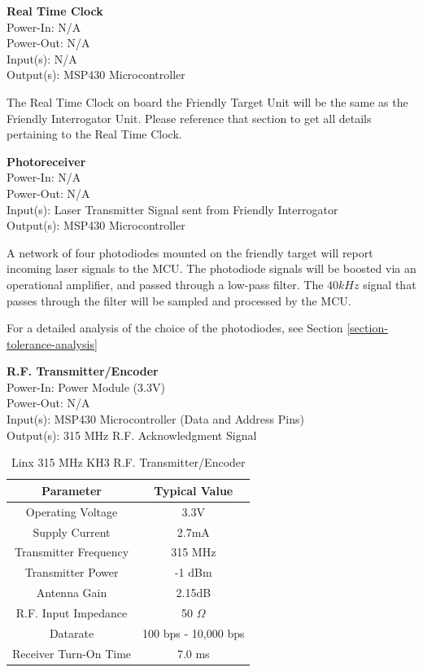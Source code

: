 \documentclass[letterpaper,10pt]{article}
\begin{document}
\begin{spacing}{1.15}
\normalsize\textbf{Real Time Clock} \\
Power-In: N/A\\
Power-Out: N/A\\
Input(s): N/A\\
Output(s): MSP430 Microcontroller

The Real Time Clock on board the Friendly Target Unit will be the same as the Friendly Interrogator Unit. Please reference that section to get all details pertaining to the Real Time Clock.

\normalsize\textbf{Photoreceiver}\\
Power-In: N/A \\
Power-Out: N/A \\
Input(s): Laser Transmitter Signal sent from Friendly Interrogator\\
Output(s): MSP430 Microcontroller

A network of four photodiodes mounted on the friendly target will report incoming laser signals to the MCU. The photodiode signals will be boosted via an operational amplifier, and passed through a low-pass filter. The $40kHz$ signal that passes through the filter will be sampled and processed by the MCU. 

For a detailed analysis of the choice of the photodiodes, see Section \ref{section-tolerance-analysis}

\normalsize\textbf{R.F. Transmitter/Encoder}\\
Power-In: Power Module (3.3V)\\
Power-Out: N/A\\ 
Input(s): MSP430 Microcontroller (Data and Address Pins)\\ 
Output(s): 315 MHz R.F. Acknowledgment Signal

\begin{table}[htbp]
	\centering
	\begin{tabular}{c|c}	%
		\toprule	%
		Parameter & Typical Value \\
		\midrule
		Operating Voltage & 3.3V\\
		Supply Current & 2.7mA\\
		Transmitter Frequency & 315 MHz \\ 
		Transmitter Power & -1 dBm \\
		Antenna Gain & 2.15dB  \\
		R.F. Input Impedance & 50 $\Omega$ \\
		Datarate & 100 bps - 10,000 bps  \\
		Receiver Turn-On Time & 7.0 ms  \\
		\bottomrule	%
	\end{tabular}%
	\caption{Linx 315 MHz KH3 R.F. Transmitter/Encoder}
	\label{tab:rf-transmitter-important-values}	%
\end{table}%


\end{spacing}
\end{document}
